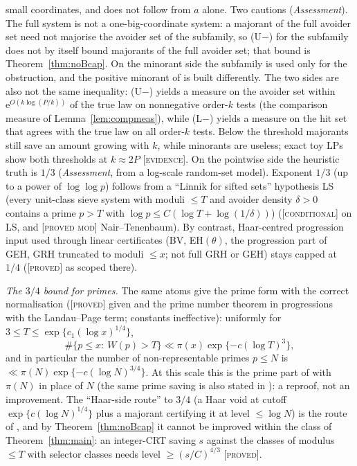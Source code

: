 \documentclass[10pt,reqno]{amsart}
\theoremstyle{definition}
\theoremstyle{remark}
\newcommand{\e}{\mathrm e}
\newcommand{\lab}[1]{\textup{[\textsc{#1}]}}
\begin{document}
small coordinates, and does not follow from $a$ alone.  Two cautions
(\emph{Assessment}).  The full system is not a one-big-coordinate system:
a majorant of the full avoider set need not majorise the avoider set of
the subfamily, so (U$-$) for the subfamily does not by itself bound
majorants of the full avoider set; that bound is Theorem~\ref{thm:noBcap}.  On
the minorant side the subfamily is used only for the obstruction, and the
positive minorant of \cite{O13} is built differently.  The two sides are also
not the same inequality: (U$-$) yields a measure on the avoider set within
$\e^{O(k\log(P/k))}$ of the true law on nonnegative order-$k$ tests (the comparison
measure of Lemma~\ref{lem:compmeas}), while (L$-$) yields a measure on the hit set
that agrees with the true law on all order-$k$ tests.  Below the threshold
majorants still save an amount growing with $k$, while minorants are
useless; exact toy LPs show both thresholds at $k\approx2P$ \cite[\S4.4]{CU}
\lab{evidence}.  On the pointwise side the heuristic truth is $1/3$
(\emph{Assessment}, from a log-scale random-set model).  Exponent $1/3$ (up to
a power of $\log\log p$) follows from a ``Linnik for sifted sets'' hypothesis
LS (every unit-class sieve system with moduli $\leq T$ and avoider density
$\delta>0$ contains a prime $p>T$ with $\log p\leq C(\log T+\log(1/\delta))$)
\cite[Thm~1.2]{O16} (\lab{conditional} on LS, and \lab{proved mod}
Nair--Tenenbaum).  By contrast, Haar-centred progression input used through
linear certificates (BV, EH$(\theta)$, the progression part of GEH, GRH truncated
to moduli $\leq x$; not full GRH or GEH) stays capped at $1/4$
\cite[Prop.~3.1]{O16} (\lab{proved} as scoped there).

\emph{The $3/4$ bound for primes.}  The same atoms give the prime form with
the correct normalisation \cite[Thm~2.1, Prop.~3.1]{CU} (\lab{proved} given
\cite{TQ} and the prime number theorem in progressions with the
Landau--Page term; constants ineffective): uniformly for
$3\leq T\leq\exp\{c_1(\log x)^{1/4}\}$,
\[
 \#\{p\leq x:\ W(p)>T\}\ll\pi(x)\exp\{-c(\log T)^3\},
\]
and in particular the number of non-representable primes $p\leq N$ is
$\ll\pi(N)\exp\{-c(\log N)^{3/4}\}$.  At this scale this is the prime part of
\cite{TQ} with $\pi(N)$ in place of $N$ (the same prime saving is also
stated in \cite[Thm.~1]{KRK}): a reproof, not an improvement.  The
``Haar-side route'' to $3/4$ (a Haar void at cutoff $\exp\{c(\log N)^{1/4}\}$ plus a
majorant certifying it at level $\leq\log N$) is the route of \cite{TQ}, and by
Theorem~\ref{thm:noBcap} it cannot be improved within the class of
Theorem~\ref{thm:main}: an integer-CRT saving $s$ against the classes of
modulus $\leq T$ with selector classes needs level $\geq(s/C)^{4/3}$
\cite[Cor.~3.3]{CU} \lab{proved}.
\end{document}
